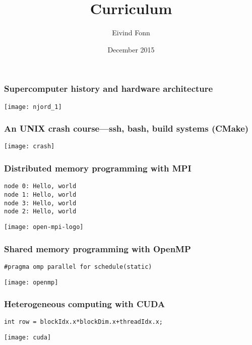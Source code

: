 

\title{Curriculum}
\author{Eivind Fonn}
\date{December 2015}
\maketitle

\begin{frame}
  \frametitle{Supercomputer history and hardware architecture}
  \begin{center}
    \texttt{[image: njord\_1]}
  \end{center}
\end{frame}

\begin{frame}
  \frametitle{An UNIX crash course---ssh, bash, build systems (CMake)}
  \begin{center}
    \texttt{[image: crash]}
  \end{center}
\end{frame}

\begin{frame}[fragile]
  \frametitle{Distributed memory programming with MPI}
  \begin{center}
    \texttt{node 0: Hello, world} \\
    \texttt{node 1: Hello, world} \\
    \texttt{node 3: Hello, world} \\
    \texttt{node 2: Hello, world}
  \end{center}
  \begin{center}
    \texttt{[image: open-mpi-logo]}
  \end{center}
\end{frame}

\begin{frame}
  \frametitle{Shared memory programming with OpenMP}
  \begin{center}
    \texttt{\#pragma omp parallel for schedule(static)}
  \end{center}
  \begin{center}
    \texttt{[image: openmp]}
  \end{center}
\end{frame}

\begin{frame}
  \frametitle{Heterogeneous computing with CUDA}
  \begin{center}
    \texttt{int row = blockIdx.x*blockDim.x+threadIdx.x;}
  \end{center}
  \begin{center}
    \texttt{[image: cuda]}
  \end{center}
\end{frame}

